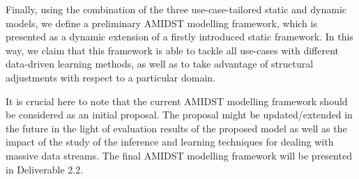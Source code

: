 Finally, using the combination of the three use-case-tailored static and dynamic models, we define a preliminary AMIDST modelling framework, which is presented as a dynamic extension of a firstly introduced static framework. In this way, we claim that this framework is able to tackle all use-cases with different data-driven learning methods, as well as to take advantage of structural adjustments with respect to a particular domain.

It is crucial here to note that the current AMIDST modelling framework should be considered as an initial proposal. The proposal might be updated/extended in the future in the light of evaluation results of the proposed model as well as the impact of the study of the inference and learning techniques for dealing with massive data streams. The final AMIDST modelling framework will be presented in Deliverable 2.2.



